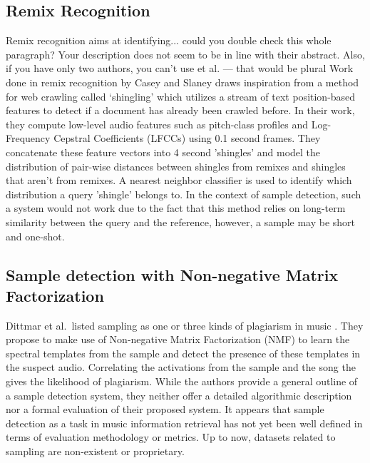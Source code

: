 \documentclass{article}
\begin{document}
\subsection{Remix Recognition}
Remix recognition aims at identifying... {\color{red}could you double check this whole paragraph? Your description does not seem to be in line with their abstract. Also, if you have only two authors, you can't use et al. --- that would be plural}
Work done in remix recognition by Casey and Slaney \cite{caseyRemix} draws inspiration from a method for web crawling called `shingling' which utilizes a stream of text position-based features to detect if a document has already been crawled before. In their work, they compute low-level audio features such as pitch-class profiles and Log-Frequency Cepstral Coefficients (LFCCs) using 0.1 second frames. They concatenate these feature vectors into 4 second 'shingles' and model the distribution of pair-wise distances between shingles from remixes and shingles that aren't from remixes. A nearest neighbor classifier is used to identify which distribution a query 'shingle' belongs to. In the context of sample detection, such a system would not work due to the fact that this method relies on long-term similarity between the query and the reference, however, a sample may be short and one-shot.

\subsection{Sample detection with Non-negative Matrix Factorization}
%
Dittmar et al.\ listed sampling as one or three kinds of plagiarism in music \cite{dittmar2012audio}. They propose to make use of Non-negative Matrix Factorization (NMF) to learn the spectral templates from the sample and detect the presence of these templates in the suspect audio. Correlating the activations from the sample and the song the gives the likelihood of plagiarism.
%
While the authors provide a general outline of a sample detection system, they neither offer a detailed algorithmic description nor a formal evaluation of their proposed system. It appears that sample detection as a task in music information retrieval has not yet been well defined in terms of evaluation methodology or metrics. Up to now, datasets related to sampling are non-existent or proprietary.
\end{document}
